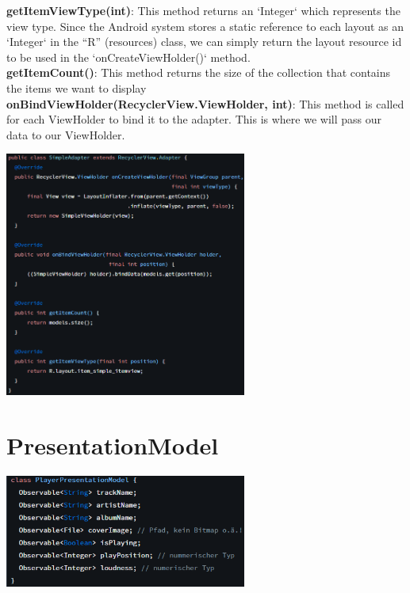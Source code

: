 \documentclass{report}
\newenvironment{Figure}
	{\par\medskip\noindent\minipage{\linewidth}}
	{\endminipage\par\medskip}
\theoremstyle{definition}
\theoremstyle{example}
\begin{document}
\textbf{getItemViewType(int)}: This method returns an `Integer` which represents the view type. Since the Android system stores a static reference to each layout as an `Integer` in the “R” (resources) class, we can simply return the layout resource id to be used in the `onCreateViewHolder()` method.\\

\textbf{getItemCount()}: This method returns the size of the collection that contains the items we want to display\\

\textbf{onBindViewHolder(RecyclerView.ViewHolder, int)}: This method is called for each ViewHolder to bind it to the adapter. This is where we will pass our data to our ViewHolder.\\

\begin{Figure}
   \centering
    \includegraphics[width=300px]{img/adapterinJava.png}
        \label{fig:Code Snippet adapter in Java}
\end{Figure}

\section{PresentationModel}
\begin{Figure}
   \centering
    \includegraphics[width=300px]{img/presentationModel.png}
        \label{fig:Code Snippet presentation Model}
\end{Figure}
\end{document}
